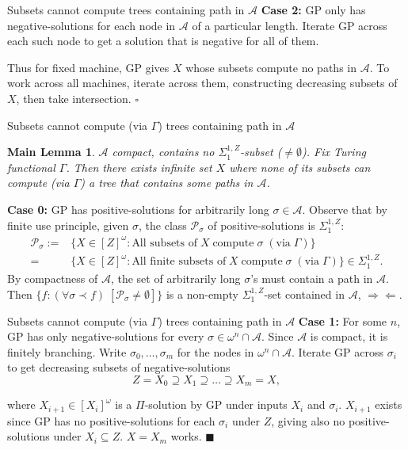 \begin{frame}{Subsets cannot compute trees containing path in $\mathcal{A}$}
  \textbf{Case 2:} GP only has negative-solutions for each node in
  $\mathcal{A}$ of a particular length. Iterate GP across each such node to
  get a solution that is negative for all of them.

  \vspace{1em}
  Thus for fixed machine, GP gives $X$ whose subsets compute no paths in
  $\mathcal{A}$. To work across all machines, iterate across them,
  constructing decreasing subsets of $X$, then take intersection. $\square$
\end{frame}

\begin{frame}{Subsets cannot compute (via $\Gamma$) trees containing path
in $\mathcal{A}$}
  \newtheorem*{main-lemma*}{Main Lemma}
  \begin{main-lemma*}
    \label{lemma:fixed-machine}
    $\mathcal{A}$ compact, contains no $\Sigma_1^{1,Z}$-subset
    ($\neq\emptyset$). Fix Turing functional $\Gamma$. Then there exists
    infinite set $X$ where none of its subsets can compute (via $\Gamma$) a
    tree that contains some paths in $\mathcal{A}$.
  \end{main-lemma*}

  \vspace{0.5em}
  \textbf{Case 0:} GP has positive-solutions for arbitrarily long
  $\sigma\in\mathcal{A}$. Observe that by finite use principle, given
  $\sigma$, the class $\mathcal{P}_{\sigma}$ of positive-solutions is
  $\Sigma_1^{1,Z}$:
  \begin{align*}
    \mathcal{P}_{\sigma}:= &\{X\in[Z]^\omega: \text{All subsets of}\; X\;
      \text{compute}\; \sigma\; (\text{via}\; \Gamma)\}\\
    =&\{X\in[Z]^\omega: \text{All finite subsets of}\; X\;
      \text{compute}\; \sigma\; (\text{via}\; \Gamma)\}
      \in\Sigma_1^{1,Z}.
  \end{align*}
  By compactness of $\mathcal{A}$, the set of arbitrarily long $\sigma$'s
  must contain a path in $\mathcal{A}$. Then $\{f:(\forall \sigma\prec f)\;
  [\mathcal{P}_\sigma \neq \emptyset]\}$ is a non-empty
  $\Sigma_1^{1,Z}$-set contained in $\mathcal{A}$, $\Rightarrow\Leftarrow$.
\end{frame}

\begin{frame}{Subsets cannot compute (via $\Gamma$) trees containing path
in $\mathcal{A}$}
  \textbf{Case 1:} For some $n$, GP has only negative-solutions for every
  $\sigma\in\omega^n\cap\mathcal{A}$. Since $\mathcal{A}$ is compact, it is
  finitely branching. Write $\sigma_0,\ldots,\sigma_m$ for the
  nodes in $\omega^n\cap\mathcal{A}$. Iterate GP across $\sigma_i$ to get
  decreasing subsets of negative-solutions
  \[Z=X_0 \supseteq X_1 \supseteq \ldots\supseteq X_m=X,\]

  where $X_{i+1}\in[X_i]^\omega$ is a $\Pi$-solution by GP under
  inputs $X_i$ and $\sigma_i$. $X_{i+1}$ exists since GP has no
  positive-solutions for each $\sigma_i$ under $Z$, giving also no
  positive-solutions under $X_i\subseteq Z$. $X=X_m$ works. $\blacksquare$
\end{frame}

